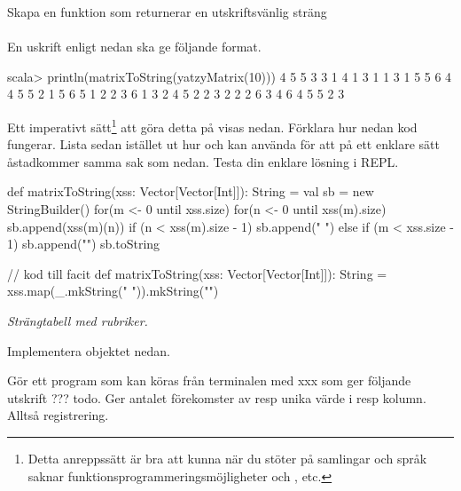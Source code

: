 \Subtask Skapa en funktion som returnerar en utskriftsvänlig sträng \\  \\ En uskrift enligt nedan ska ge följande format. 
\begin{REPL}
scala> println(matrixToString(yatzyMatrix(10)))
4 5 5 3 3
1 4 1 3 1
1 3 1 5 5
6 4 4 5 5
2 1 5 6 5
1 2 2 3 6
1 3 2 4 5
2 2 3 2 2
2 6 3 4 6
4 5 5 2 3

\end{REPL}
Ett imperativt sätt\footnote{Detta anreppssätt är bra att kunna när du stöter på samlingar och språk saknar funktionsprogrammeringsmöjligheter och ,  etc.} att göra detta på visas nedan. Förklara hur nedan kod fungerar. Lista sedan istället ut hur  och  kan använda för att på ett enklare sätt åstadkommer samma sak som nedan. Testa din enklare lösning i REPL.
\begin{Code}
def matrixToString(xss: Vector[Vector[Int]]): String = {
  val sb = new StringBuilder()
  for(m <- 0 until xss.size) {
    for(n <- 0 until xss(m).size) { 
      sb.append(xss(m)(n))
      if (n < xss(m).size - 1) sb.append(" ") 
      else if (m < xss.size - 1) sb.append("\n")
    }
  }
  sb.toString
}
\end{Code}

 
\begin{Code}
// kod till facit
def matrixToString(xss: Vector[Vector[Int]]): String = 
  xss.map(_.mkString(" ")).mkString("\n")
\end{Code}





\Task \emph{Strängtabell med rubriker.} 

\Subtask Implementera objektet  nedan.

\Subtask Gör ett program som kan köras från terminalen med xxx som ger följande utskrift ??? todo. Ger antalet förekomster av resp unika värde i resp kolumn. Alltså registrering.




